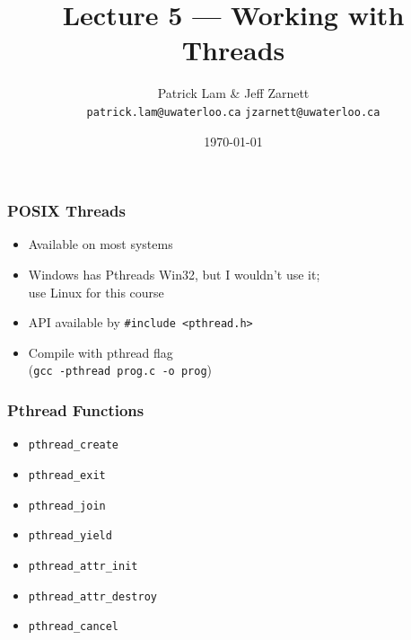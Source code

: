 

\title{Lecture 5 --- Working with Threads }

\author{Patrick Lam \& Jeff Zarnett \\ \small \texttt{patrick.lam@uwaterloo.ca} \texttt{jzarnett@uwaterloo.ca}}
\date{\today}




\begin{frame}
  \titlepage

 \end{frame}



\begin{frame}
  \frametitle{POSIX Threads}


  \begin{itemize}
    \item Available on most systems
    \vfill
    \item Windows has Pthreads Win32, but I wouldn't use it; \\use Linux for
          this course
    \vfill
    \item API available by {\tt \#include <pthread.h>}
    \vfill
    \item Compile with pthread flag \\ ({\tt gcc -pthread prog.c -o prog})
  \end{itemize}

\end{frame}



\begin{frame}
\frametitle{Pthread Functions}

\begin{itemize}
	\item \texttt{pthread\_create}
	\item \texttt{pthread\_exit}
	\item \texttt{pthread\_join}
	\item \texttt{pthread\_yield} 
	\item \texttt{pthread\_attr\_init}
	\item \texttt{pthread\_attr\_destroy}
	\item \texttt{pthread\_cancel}
\end{itemize}


\end{frame}


